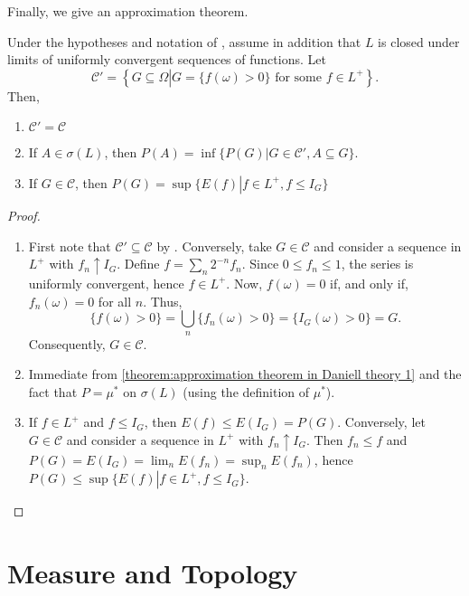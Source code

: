 Finally, we give an approximation theorem.
\begin{thrm}\label{theorem:approximation theorem in Daniell theory}
		Under the hypotheses and notation of , assume in addition that \(L\) is closed under limits of uniformly convergent sequences of functions. Let
		\[
		\mathcal{C}'=\left\{G\subseteq\Omega\left|G=\{f(\omega)>0\} \text{ for some }f\in L^{+}\right.\right\}
		.\]
		Then,
		\begin{enumerate}
				\item\label{theorem:approximation theorem in Daniell theory 1} \(\mathcal{C}'=\mathcal{C}\) 
				\item\label{theorem:approximation theorem in Daniell theory 2} If \(A\in\sigma(L)\), then \(P(A)=\inf\{P(G)\left|G\in\mathcal{C}', A\subseteq G\right.\}\).
				\item\label{theorem:approximation theorem in Daniell theory 3} If \(G\in\mathcal{C}\), then \(P(G)=\sup\{E(f)\left|f\in L^{+},f\leq I_G\right.\}\)
		\end{enumerate}
\end{thrm}
\begin{proof}
		\begin{enumerate}
				\item First note that \(\mathcal{C}'\subseteq\mathcal{C}\) by . Conversely, take \(G\in\mathcal{C}\) and consider a sequence in \(L^{+}\) with \(f_n\uparrow I_G\). 
				Define \(f=\sum_{n} 2^{-n}f_n\). Since \(0\leq f_n\leq 1\), the series is uniformly convergent, hence \(f\in L^{+}\). Now, \(f(\omega)=0\) if, and only if, \(f_n(\omega)=0\) for all \(n\). Thus,
				\[
					\{f(\omega)>0\} = \bigcup_{n} \{f_n(\omega)>0\}=\{I_G(\omega)>0\} = G	
				.\]
				Consequently, \(G\in \mathcal{C}\). 
				\item Immediate from \ref{theorem:approximation theorem in Daniell theory 1} and the fact that \(P=\mu^* \) on \(\sigma(L)\) (using the definition of \(\mu^*\)).
				\item If \(f\in L^{+}\) and \(f\leq I_G\), then \(E(f) \leq E(I_G)=P(G)\). Conversely, let \(G\in \mathcal{C}\) and consider a sequence in \(L^{+}\) with \(f_n\uparrow I_G\). Then \(f_n\leq f\) and \(P(G)=E(I_G)=\lim_n E(f_n) = \sup_n E(f_n)\), hence \(P(G) \leq \sup \{E(f)\left|f\in L^{+}, f \leq I_G\right.\}\). 

		\end{enumerate}
\end{proof}
\section{Measure and Topology}\label{section:Measure and Topology}

